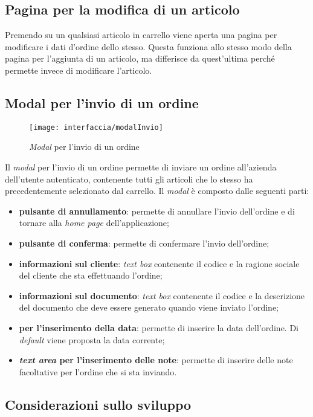 \subsection{Pagina per la modifica di un articolo}

Premendo su un qualsiasi articolo in carrello viene aperta una pagina per modificare i dati d'ordine dello stesso. Questa funziona allo stesso modo della pagina per l'aggiunta di un articolo, ma differisce da quest'ultima perché permette invece di modificare l'articolo.

\subsection{Modal per l'invio di un ordine}

\begin{figure}[!h] 
    \centering 
    \texttt{[image: interfaccia/modalInvio]} 
    \caption{\textit{Modal} per l'invio di un ordine}
\end{figure}

Il \textit{modal} per l'invio di un ordine permette di inviare un ordine all'azienda dell'utente autenticato, contenente tutti gli articoli che lo stesso ha precedentemente selezionato dal carrello. Il \textit{modal} è composto dalle seguenti parti:
\begin{itemize}
	\item \textbf{pulsante di annullamento}: permette di annullare l'invio dell'ordine e di tornare alla \textit{home page} dell'applicazione;
	\item \textbf{pulsante di conferma}: permette di confermare l'invio dell'ordine;
	\item \textbf{informazioni sul cliente}: \textit{text box} contenente il codice e la ragione sociale del cliente che sta effettuando l'ordine;
	\item \textbf{informazioni sul documento}: \textit{text box} contenente il codice e la descrizione del documento che deve essere generato quando viene inviato l'ordine;
	\item \textbf{ per l'inserimento della data}: permette di inserire la data dell'ordine. Di \textit{default} viene proposta la data corrente;
	\item \textbf{\textit{text area} per l'inserimento delle note}: permette di inserire delle note facoltative per l'ordine che si sta inviando.
\end{itemize}

\subsection{Considerazioni sullo sviluppo}

